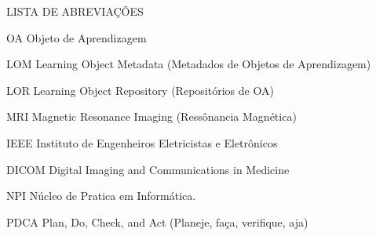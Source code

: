 \documentclass[12pt,openright,oneside,a4paper,english,french,spanish,brazil]{unifil}
\begin{document}
\cleardoublepage

\begin{large}
\begin{center}
    LISTA DE ABREVIAÇÕES 
    \bigskip
    \bigskip
\end{center}
\end{large}

\newcommand{\abbrlabel}[1]{\makebox[3cm][l]{\textbf{#1}}}
\newenvironment{abbreviations}{\begin{list}{}{\renewcommand{\makelabel}{\abbrlabel}}}{\end{list}}	

\begin{abbreviations}
\item[OA] Objeto de Aprendizagem
\item[LOM] Learning Object Metadata (Metadados de Objetos de Aprendizagem)
\item[LOR] Learning Object Repository (Repositórios de OA)
\item[MRI] Magnetic Resonance Imaging (Ressônancia Magnética)
\item[IEEE] Instituto de Engenheiros Eletricistas e Eletrônicos
\item[DICOM] Digital Imaging and Communications in Medicine
\item[NPI] Núcleo de Pratica em Informática.
\item[PDCA] Plan, Do, Check, and Act (Planeje, faça, verifique, aja)
\end{abbreviations}
\cleardoublepage

\listoffigures*

\cleardoublepage

\par
\vspace{11cm}

\tableofcontents*

  \setlength\absleftindent{0cm}
  \setlength\absrightindent{0cm}
  
  \abstracttextfont{\normalfont\normalsize}

  \setlength{\absparindent}{0pt}
  \setlength{\absparsep}{18pt}

\cleardoublepage

\textual

\renewcommand{\ABNTEXchapterfont}{\fontfamily{cmr}\fontseries{b}\selectfont}
\renewcommand{\ABNTEXchapterfontsize}{\Large}
\end{document}
